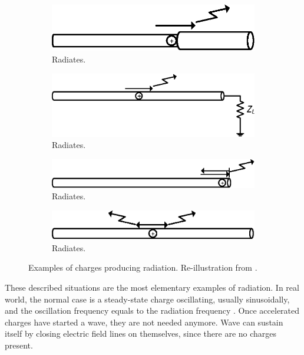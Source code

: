\begin{figure}[H]
     \begin{subfigure}[b]{0.4\textwidth}
        \includegraphics[width=\textwidth]{img/radiations_discont.eps}
        \caption{Radiates.}
        \label{fig:discont}
    \end{subfigure}
    \begin{subfigure}[b]{0.4\textwidth}
        \includegraphics[width=\textwidth]{img/radiations_terminated.eps}
        \caption{Radiates.}
        \label{fig:terminated}
    \end{subfigure}
    
     \begin{subfigure}[b]{0.4\textwidth}
        \includegraphics[width=\textwidth]{img/radiations_truncated.eps}
        \caption{Radiates.}
        \label{fig:truncated}
    \end{subfigure}
    \begin{subfigure}[b]{0.4\textwidth}
        \includegraphics[width=\textwidth]{img/radiations_osc.eps}
        \caption{Radiates.}
        \label{fig:osc}
    \end{subfigure}
    \caption{Examples of charges producing radiation. Re-illustration from \cite{saunders, balanis}.}
    \label{fig:charges}
\end{figure}

These described situations are the most elementary examples of radiation. In real world, the normal case is a steady-state charge oscillating, usually sinusoidally, and the oscillation frequency equals to the radiation frequency \cite{stutzman}. Once accelerated charges have started a wave, they are not needed anymore. Wave can sustain itself by closing electric field lines on themselves, since there are no charges present. %

